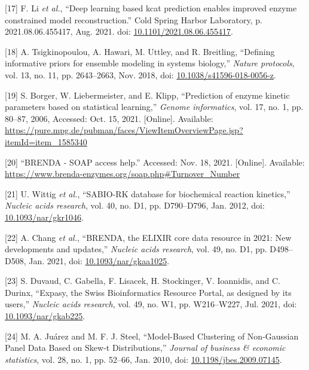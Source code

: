 \documentclass[11pt]{article}
\begin{document}
\hypertarget{citeproc_bib_item_17}{[17] F. Li \textit{et al.}, “Deep learning based kcat prediction enables improved enzyme constrained model reconstruction.” Cold Spring Harbor Laboratory, p. 2021.08.06.455417, Aug. 2021. doi: \href{https://doi.org/10.1101/2021.08.06.455417}{10.1101/2021.08.06.455417}.}

\hypertarget{citeproc_bib_item_18}{[18] A. Tsigkinopoulou, A. Hawari, M. Uttley, and R. Breitling, “Defining informative priors for ensemble modeling in systems biology,” \textit{Nature protocols}, vol. 13, no. 11, pp. 2643–2663, Nov. 2018, doi: \href{https://doi.org/10.1038/s41596-018-0056-z}{10.1038/s41596-018-0056-z}.}

\hypertarget{citeproc_bib_item_19}{[19] S. Borger, W. Liebermeister, and E. Klipp, “Prediction of enzyme kinetic parameters based on statistical learning,” \textit{Genome informatics}, vol. 17, no. 1, pp. 80–87, 2006, Accessed: Oct. 15, 2021. [Online]. Available: \url{https://pure.mpg.de/pubman/faces/ViewItemOverviewPage.jsp?itemId=item_1585340}}

\hypertarget{citeproc_bib_item_20}{[20] “BRENDA - SOAP access help.” Accessed: Nov. 18, 2021. [Online]. Available: \url{https://www.brenda-enzymes.org/soap.php#Turnover_Number}}

\hypertarget{citeproc_bib_item_21}{[21] U. Wittig \textit{et al.}, “SABIO-RK database for biochemical reaction kinetics,” \textit{Nucleic acids research}, vol. 40, no. D1, pp. D790–D796, Jan. 2012, doi: \href{https://doi.org/10.1093/nar/gkr1046}{10.1093/nar/gkr1046}.}

\hypertarget{citeproc_bib_item_22}{[22] A. Chang \textit{et al.}, “BRENDA, the ELIXIR core data resource in 2021: New developments and updates,” \textit{Nucleic acids research}, vol. 49, no. D1, pp. D498–D508, Jan. 2021, doi: \href{https://doi.org/10.1093/nar/gkaa1025}{10.1093/nar/gkaa1025}.}

\hypertarget{citeproc_bib_item_23}{[23] S. Duvaud, C. Gabella, F. Lisacek, H. Stockinger, V. Ioannidis, and C. Durinx, “Expasy, the Swiss Bioinformatics Resource Portal, as designed by its users,” \textit{Nucleic acids research}, vol. 49, no. W1, pp. W216–W227, Jul. 2021, doi: \href{https://doi.org/10.1093/nar/gkab225}{10.1093/nar/gkab225}.}

\hypertarget{citeproc_bib_item_24}{[24] M. A. Juárez and M. F. J. Steel, “Model-Based Clustering of Non-Gaussian Panel Data Based on Skew-t Distributions,” \textit{Journal of business \& economic statistics}, vol. 28, no. 1, pp. 52–66, Jan. 2010, doi: \href{https://doi.org/10.1198/jbes.2009.07145}{10.1198/jbes.2009.07145}.}
\end{document}
